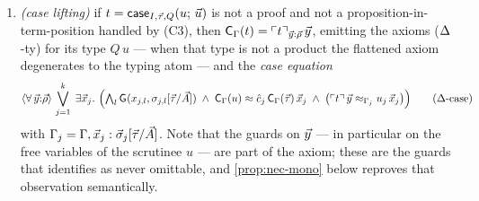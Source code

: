 \begin{definition}[Translation]
\begin{enumerate}[label=(C\arabic*),leftmargin=3em]
\[\begin{cases}
      u \approx \trC{\Gamma'}{b} & \text{if $b$ is a data object;}
    \end{cases}
  \]
  additionally the \emph{typing atoms and flattened typing axiom}
  for $\lift{t}$ are emitted:
  \[
    \langle \forall\, \tup{y}{:}\tup{\rho} \rangle\,
      \hastype\bigl(\lift{t}\,\tup{y},\ \trC{\Gamma}{T}\bigr),
    \qquad
    \langle \forall\, \tup{y}{:}\tup{\rho} \rangle\,
      \mathrm{Flat}_{\Gamma}\bigl(\lift{t}\,\tup{y},\ T\bigr)
    \tag{$\Ax$-ty}
  \]
  where $T$ is the type of $t$ (a non-propositional product, since
  $t$ is not a proof);
\item \emph{(case lifting)} if $t = \mathsf{case}_{I,\vec{\tau},Q}(u;\,\vec{u})$
  is not a proof and not a proposition-in-term-position handled by
  (C3), then $\mathsf{C}_{\Gamma}(t) =
  \ulcorner t \urcorner_{\vec{y}:\vec{\rho}}\,\vec{y}$, emitting the axioms
  ($\Delta$-ty) for its type $Q\,u$ --- when that type is not a product
  the flattened axiom degenerates to the typing atom --- and the
  \emph{case equation}
  \[
    \langle \forall\, \tup{y}{:}\tup{\rho} \rangle\,
    \bigvee_{j=1}^{k}\;
    \exists \tup{x}_j.\ \Bigl(
      \textstyle\bigwedge_l \trG{}{x_{j,l}}{\sigma_{j,l}[\tup{\tau}/\tup{A}]}
      \;\wedge\;
      \trC{\Gamma}{u} \approx
        \hat{c}_j\, \trC{\Gamma}{\tup{\tau}}\, \tup{x}_j
      \;\wedge\;
      \bigl( \lift{t}\,\tup{y} \approx_{\Gamma_j} u_j\,\tup{x}_j \bigr)
    \Bigr)
    \tag{$\Ax$-case}
  \]
  with $\Gamma_j = \Gamma, \vec{x}_j : \vec{\sigma}_j[\vec{\tau}/\vec{A}]$.
  Note that the guards on $\vec{y}$ --- in particular on the free
  variables of the scrutinee $u$ --- are part of the axiom; these
  are the guards that \cite[\S5.6]{CzajkaKaliszyk2018} identifies as
  never omittable, and \cref{prop:nec-mono} below reproves that
  observation semantically.
\end{enumerate}
\end{definition}


